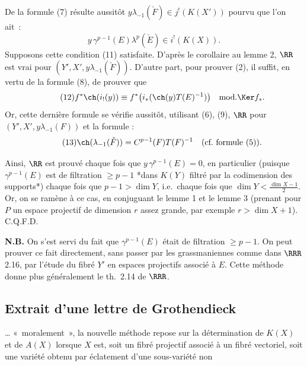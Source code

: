 De la
formule (7) résulte aussitôt \(y\lambda_{-1}(\check F)\in j^!(K(X'))\) pourvu que l'on ait~:
\begin{equation}\tag{11}
  y\,\gamma^{p-1}(E)\lambda^p(\check E)\in i^!(K(X)).
\end{equation}
Supposons cette condition (11) satisfaite. D'après le corollaire au lemme 2, \(\RR\) est vrai pour \((Y',X',y\lambda_{-1}(\check F))\). D'autre part, pour prouver (2), il suffit, en vertu de la formule (8), de prouver que
\begin{equation}\tag{12}
  f^*\ch(i_!(y))
  \equiv
  f^*\bigl(i_*(\ch(y)T(E)^{-1})\bigr)
  \quad\text{mod.}\Ker f_*.
\end{equation}
Or, cette dernière formule se vérifie aussitôt, utilisant (6), (9), \(\RR\) pour \((Y',X',y\lambda_{-1}(F))\) et la formule :
\begin{equation}\tag{13}
  \ch(\lambda_{-1}(\check F))=C^{p-1}(F)T(F)^{-1}\quad\text{(cf.\ formule (5)).}
\end{equation}

Ainsi, \(\RR\) est prouvé chaque fois que \(y\,\gamma^{p-1}(E)=0\), en particulier (puisque \(\gamma^{p-1}(E)\) est de filtration \(\geq p-1\) {*}dans \(K(Y)\) filtré par la codimension des supports{*}) chaque fois que \(p-1>\dim Y\), i.e.\ chaque fois que \(\dim Y<\frac{\dim X-1}{2}\). Or, on se ramène à ce cas, en conjuguant le lemme 1 et le lemme 3 (prenant pour \(P\) un espace projectif de dimension \(r\) assez grande, par exemple \(r>\dim X+1\)). C.Q.F.D.

\textbf{N.B.} On s'est servi du fait que \(\gamma^{p-1}(E)\) était de filtration \(\geq p-1\). On peut prouver ce fait directement, sans passer par les grassmaniennes comme dans \(\RRR\) 2.16, par l'étude du fibré \(Y'\) en espaces projectifs associé à \(E\). Cette méthode donne plus généralement le th.\ 2.14 de \(\RRR\).

\subsection*{Extrait d'une lettre de Grothendieck}
\dots{} «~moralement~», la nouvelle méthode repose sur la détermination de \(K(X)\) et de \(A(X)\) lorsque \(X\) est, soit un fibré projectif associé à un fibré vectoriel, soit une variété obtenu par éclatement d'une sous-variété non
